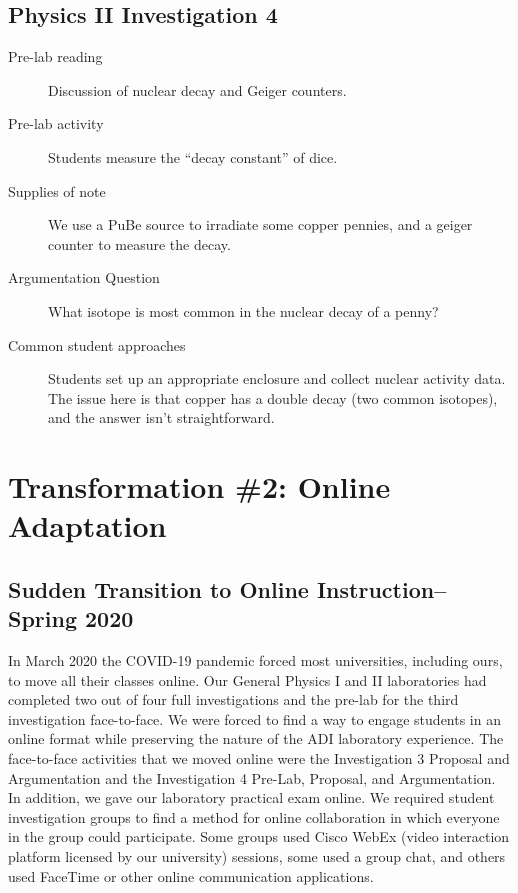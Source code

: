 \documentclass[aip, numerical, preprint]{revtex4-2}
\begin{document}
\subsection{Physics \textrm{II} Investigation 4}
\begin{description}
  \item[Pre-lab reading] Discussion of nuclear decay and Geiger counters.
  \item[Pre-lab activity] Students measure the ``decay constant'' of dice.
  \item[Supplies of note] We use a PuBe source to irradiate some copper pennies, and a geiger
  counter to measure the decay.
  \item[Argumentation Question] What isotope is most common in the nuclear decay of a penny?
  \item[Common student approaches] Students set up an appropriate enclosure and collect nuclear
  activity data.  The issue here is that copper has a double decay (two common isotopes), and
  the answer isn't straightforward.
\end{description}


\section{Transformation \#2: Online Adaptation}

\subsection{Sudden Transition to Online Instruction--Spring 2020}

In March 2020 the COVID-19 pandemic forced most universities, including ours, to move all their
classes online. Our General Physics I and II laboratories had completed two out of four full
investigations and the pre-lab for the third investigation face-to-face. We were forced to find
a way to engage students in an online format while preserving the nature of the ADI laboratory
experience. The face-to-face activities that we moved online were the Investigation 3 Proposal
and Argumentation and the Investigation 4 Pre-Lab, Proposal, and Argumentation. In addition, we
gave our laboratory practical exam online. We required student investigation groups to find a
method for online collaboration in which everyone in the group could participate. Some groups
used Cisco WebEx (video interaction platform licensed by our university) sessions, some used a
group chat, and others used FaceTime or other online communication applications.
\end{document}
